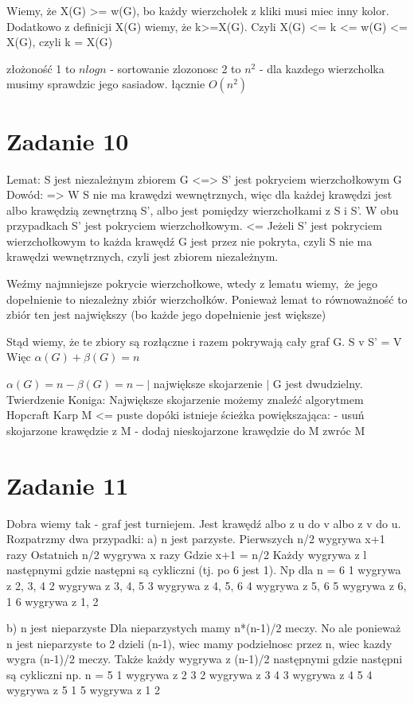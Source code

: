 \documentclass[12pt]{article}
\begin{document}
Wiemy, że X(G) >= w(G), bo każdy wierzchołek z kliki musi miec inny kolor. 
Dodatkowo z definicji X(G) wiemy, że k>=X(G). Czyli X(G) <= k <= w(G) <= X(G), czyli k = X(G)


złożoność 1 to $nlogn$ - sortowanie
zlozonosc 2 to $n^2$ - dla kazdego wierzcholka musimy sprawdzic jego sasiadow.
łącznie $O(n^2)$ 

\section{Zadanie 10}%
Lemat:
S jest niezależnym zbiorem G <=> S' jest pokryciem wierzchołkowym G 
Dowód:
=> W S nie ma krawędzi wewnętrznych, więc dla każdej krawędzi jest albo krawędzią zewnętrzną S', albo jest pomiędzy wierzchołkami z S i S'. W obu przypadkach S' jest pokryciem wierzchołkowym.
<= Jeżeli S' jest pokryciem wierzchołkowym to każda krawędź G jest przez nie pokryta, czyli S nie ma krawędzi wewnętrznych, czyli jest zbiorem niezależnym.

Weźmy najmniejsze pokrycie wierzchołkowe, wtedy z lematu wiemy, że jego dopełnienie to niezależny zbiór wierzchołków. Ponieważ lemat to równoważność to zbiór ten jest największy (bo każde jego dopełnienie jest większe)

Stąd wiemy, że te zbiory są rozłączne i razem pokrywają cały graf G. S v S' = V
Więc $\alpha(G) + \beta(G) = n$

$\alpha(G) = n - \beta(G) = n - |$ największe skojarzenie $|$
G jest dwudzielny. Twierdzenie Koniga:
Największe skojarzenie możemy znaleźć algorytmem Hopcraft Karp
M <= puste
dopóki istnieje ścieżka powiększająca:
- usuń skojarzone krawędzie z M 
- dodaj nieskojarzone krawędzie do M 
zwróc M

\section{Zadanie 11} %
Dobra wiemy tak - graf jest turniejem. Jest krawędź albo z u do v albo z v do u.
Rozpatrzmy dwa przypadki:
a) n jest parzyste.
Pierwszych n/2 wygrywa x+1 razy 
Ostatnich n/2 wygrywa x razy 
Gdzie x+1 = n/2 
Każdy wygrywa z l następnymi gdzie następni są cykliczni (tj. po 6 jest 1).
Np dla n = 6 
1 wygrywa z 2, 3, 4
2 wygrywa z 3, 4, 5
3 wygrywa z 4, 5, 6
4 wygrywa z 5, 6
5 wygrywa z 6, 1
6 wygrywa z 1, 2

b) n jest nieparzyste
Dla nieparzystych mamy n*(n-1)/2 meczy. No ale ponieważ n jest nieparzyste to 2 dzieli (n-1), wiec mamy podzielnosc przez n, wiec kazdy wygra (n-1)/2 meczy.
Także każdy wygrywa z (n-1)/2 następnymi gdzie następni są cykliczni np.
n = 5
1 wygrywa z 2 3
2 wygrywa z 3 4 
3 wygrywa z 4 5 
4 wygrywa z 5 1 
5 wygrywa z 1 2
\end{document}
